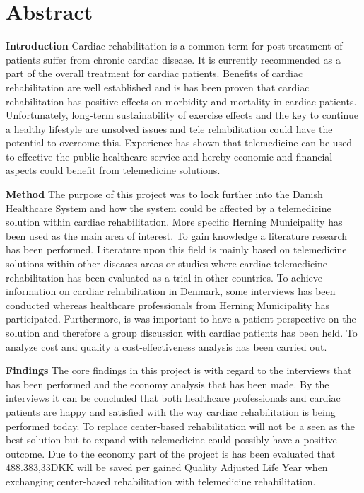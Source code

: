 \chapter{Abstract}

\textbf{Introduction} \newline
Cardiac rehabilitation is a common term for post treatment of patients suffer from chronic cardiac disease. It is currently recommended as a part of the overall treatment for cardiac patients. Benefits of cardiac rehabilitation are well established and is has been proven that cardiac rehabilitation has positive effects on morbidity and mortality in cardiac patients. Unfortunately, long-term sustainability of exercise effects and the key to continue a healthy lifestyle are unsolved issues and tele rehabilitation could have the potential to overcome this. Experience has shown that telemedicine can be used to effective the public healthcare service and hereby economic and financial aspects could benefit from telemedicine solutions.  

\textbf{Method} \newline
The purpose of this project was to look further into the Danish Healthcare System and how the system could be affected by a telemedicine solution within cardiac rehabilitation. More specific Herning Municipality has been used as the main area of interest. To gain knowledge a literature research has been performed. Literature upon this field is mainly based on telemedicine solutions within other diseases areas or studies where cardiac telemedicine rehabilitation has been evaluated as a trial in other countries. To achieve information on cardiac rehabilitation in Denmark, some interviews has been conducted whereas healthcare professionals from Herning Municipality has participated. Furthermore, is was important to have a patient perspective on the solution and therefore a group discussion with cardiac patients has been held. To analyze cost and quality a cost-effectiveness analysis has been carried out.  

\textbf{Findings} \newline
The core findings in this project is with regard to the interviews that has been performed and the economy analysis that has been made. By the interviews it can be concluded that both healthcare professionals and cardiac patients are happy and satisfied with the way cardiac rehabilitation is being performed today. To replace center-based rehabilitation will not be a seen as the best solution but to expand with telemedicine could possibly have a positive outcome. Due to the economy part of the project is has been evaluated that 488.383,33DKK will be saved per gained Quality Adjusted Life Year when exchanging center-based rehabilitation with telemedicine rehabilitation.  

